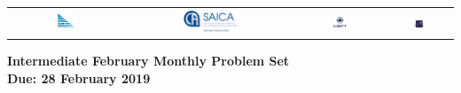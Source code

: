 \documentclass[a4paper,12pt,titlepage]{article}
\begin{document}
\setlength{\tabcolsep}{0.015\textwidth}
\begin{center} \begin{tabular}{cccc}
	\includegraphics[width=0.16\textwidth]{SAMF_logo.jpg} &
	\includegraphics[width=0.35\textwidth]{SAICA_logo.jpg} &
	\includegraphics[width=0.18\textwidth]{Liberty_logo.jpg} &
	\includegraphics[width=0.18\textwidth]{SAMO2019.png}
\end{tabular} \end{center}


\vspace{30pt}

\begin{center}
\textbf{\Large Intermediate February Monthly Problem Set}
\\ \vspace{1em}
\textbf{\large Due: 28 February 2019}
\end{center}

\vspace{4pt}
\end{document}
